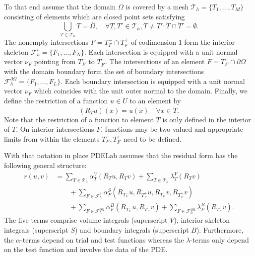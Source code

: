 \documentclass[a4paper,12pt]{article}
\theoremstyle{definition}
\begin{document}
To that end assume that the domain $\Omega$ is covered by a mesh
$\mathcal{T}_h = \{T_1, \ldots, T_M\}$ consisting of elements
which are closed point sets satisfying
\begin{equation}
\bigcup_{T\in \mathcal{T}_h} T = \overline{\Omega}, \quad 
\forall T, T' \in \mathcal{T}_h, T\neq T' : \mathring{T} \cap \mathring{T}' = \emptyset .
\end{equation}
The nonempty intersections $F = T_F^-\cap T_F^+$ 
of codimension 1 form the interior skeleton $\mathcal{F}_h^i=\{F_1,\ldots,F_N\}$.
Each intersection is equipped with a unit normal vector $\nu_F$ pointing from $T_F^-$ to $T_F^+$.
The intersections of an element $F=T_F^-\cap\partial\Omega$ with the domain
boundary form the set of boundary intersections $\mathcal{F}_h^{\partial\Omega}=
\{F_1,\ldots,F_L\}$. Each boundary intersection is equipped with a unit normal vector
$\nu_F$ which coincides with the unit outer normal to the domain. Finally, we define the restriction
of a function $u\in U$ to an element by
\begin{equation*}
(R_T u)(x) = u(x) \quad \forall x\in\mathring{T} .
\end{equation*}
Note that the restriction of a function to element $T$ is only defined in
the interior of $T$. On interior intersections $F$, functions may be two-valued
and appropriate limits from within the elements $T_F^-, T_F^+$ need to be defined.

With that notation in place PDELab assumes that the residual form has
the following general structure:
\begin{equation}
\begin{split}
r(u,v) &= 
\sum_{T\in\mathcal{T}_h} \alpha_T^V(R_T u, R_T v) 
+ \sum_{T\in\mathcal{T}_h} \lambda_T^V(R_T v) \\
&\qquad+ \sum_{F\in\mathcal{F}_h^i} \alpha_F^S(R_{T_F^-} u,R_{T_F^+} u, R_{T_F^-} v, R_{T_F^+} v)\\
&\qquad+ \sum_{F\in\mathcal{F}_h^{\partial\Omega}} \alpha_F^B(R_{T_F^-} u, R_{T_F^-} v)
+ \sum_{F\in\mathcal{F}_h^{\partial\Omega}} \lambda_F^B(R_{T_F^-} v) .
\end{split}\label{eq:GeneralResidualForm}
\end{equation}
The five terms comprise volume integrals (superscript $V$), interior skeleton integrals
(superscript $S$) and boundary integrals (superscript $B$). Furthermore, the
$\alpha$-terms depend on trial and test functions whereas the $\lambda$-terms only
depend on the test function and involve the data of the PDE.
\end{document}
